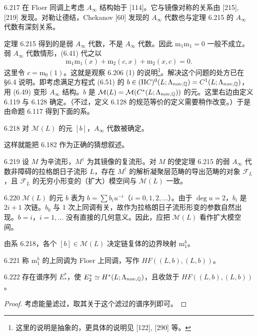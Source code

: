 \begin{remark}{6.217}
  在 Floer 同调上考虑 $A_{\infty}$ 结构始于 [114]。它与镜像对称的关系由 [215], [219] 发现。对勒让德结，Chekanov [60] 发现的 $A_{\infty}$ 代数也与定理 6.215 的 $A_{\infty}$ 代数有深刻关系。
\end{remark}

定理 6.215 得到的是弱 $A_{\infty}$ 代数，不是 $A_{\infty}$ 代数。因此 $\mathrm{m}_1\mathrm{m}_1=0$ 一般不成立。弱 $A_{\infty}$ 代数情形，(6.41) 代之以
\[
  \mathrm{m}_1\mathrm{m}_1(x)+\mathrm{m}_2(c,x)+\mathrm{m}_2(x,c)=0.
\]
这里令 $c=\mathrm{m}_0(1)$。这就是观察 6.206 (1) 的说明\footnote{这里的说明是抽象的，更具体的说明见 [122], [290] 等。}。解决这个问题的处方已在 §6.4 说明。即考虑满足方程式 (6.51) 的 $b\in(\mathrm{II}C)^0(L;\Lambda_{nov,\mathbb{Q}})=C^1(L;\Lambda_{nov,\mathbb{Q}})$，用 (6.49) 变形 $A_{\infty}$ 结构。$b$ 是 $\mathcal M(L)=\mathcal M(C^*(L;\Lambda_{nov,\mathbb{Q}}))$ 的元。这里右边由定义 6.119 与 6.128 确定。（不过，定义 6.128 的规范等价的定义需要稍作改变。）于是由命题 6.117 得到下面的系。

\begin{corollary}{6.218}
  对 $\mathcal M(L)$ 的元 $[b]$，$A_{\infty}$ 代数被确定。
\end{corollary}

这样就能把 6.182 作为正确的猜想叙述。

\begin{conjecture}{6.219}
  设 $M$ 为辛流形，$M^\dagger$ 为其镜像的复流形。对 $M$ 的使定理 6.215 的弱 $A_{\infty}$ 代数非障碍的拉格朗日子流形 $L$，存在 $M^\dagger$ 的解析凝聚层范畴的导出范畴的对象 $\mathcal F_L$，且 $\mathcal F_L$ 的无穷小形变的（扩大）模空间与 $\mathcal M(L)$ 一致。
\end{conjecture}

\begin{remark}{6.220}
  $\mathcal M(L)$ 的元 $b$ 表为 $b=\sum b_iu^{-i}$（$i=0,1,2,\dots$）。由于 $\deg u=2$，$b_i$ 是 $2i+1$ 次链。$b_0$ 与 1 次上同调有关，故作为拉格朗日子流形形变的参数自然出现。$b=i$，$i=1,\dots$ 没有直接的几何意义。因此，应把 $\mathcal M(L)$ 看作扩大模空间。
\end{remark}

由系 6.218，各个 $[b]\in\mathcal M(L)$ 决定链复体的边界映射 $\mathrm{m}_1^b$。

\begin{definition}{6.221}
  称 $\mathrm{m}_1^b$ 的上同调为 Floer 上同调，写作 $HF((L,b),(L,b))$。
\end{definition}

\begin{theorem*}{6.222}
  存在谱序列 $E_*^*$，使 $E_2^*\simeq H^*(L;\Lambda_{nov,\mathbb{Q}})$，且收敛于 $HF((L,b),(L,b))$。
\end{theorem*}
\begin{proof}
  考虑能量滤过，取其关于这个滤过的谱序列即可。
\end{proof}

